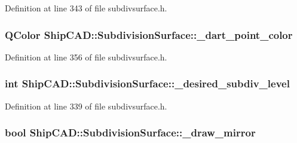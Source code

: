 Definition at line 343 of file subdivsurface.\-h.

\hypertarget{classShipCAD_1_1SubdivisionSurface_a45054fd2d0065a342828bcd675e91307}{
\subsubsection[{\-\_\-dart\-\_\-point\-\_\-color}]{\setlength{\rightskip}{0pt plus 5cm}Q\-Color Ship\-C\-A\-D\-::\-Subdivision\-Surface\-::\-\_\-dart\-\_\-point\-\_\-color\hspace{0.3cm}{\ttfamily [protected]}}}\label{classShipCAD_1_1SubdivisionSurface_a45054fd2d0065a342828bcd675e91307}


Definition at line 356 of file subdivsurface.\-h.

\hypertarget{classShipCAD_1_1SubdivisionSurface_aeec20f09be87e6d57d88f903853ca96f}{
\subsubsection[{\-\_\-desired\-\_\-subdiv\-\_\-level}]{\setlength{\rightskip}{0pt plus 5cm}int Ship\-C\-A\-D\-::\-Subdivision\-Surface\-::\-\_\-desired\-\_\-subdiv\-\_\-level\hspace{0.3cm}{\ttfamily [protected]}}}\label{classShipCAD_1_1SubdivisionSurface_aeec20f09be87e6d57d88f903853ca96f}


Definition at line 339 of file subdivsurface.\-h.

\hypertarget{classShipCAD_1_1SubdivisionSurface_a4ee73ae98bddfe1819419afd1d5ba029}{
\subsubsection[{\-\_\-draw\-\_\-mirror}]{\setlength{\rightskip}{0pt plus 5cm}bool Ship\-C\-A\-D\-::\-Subdivision\-Surface\-::\-\_\-draw\-\_\-mirror\hspace{0.3cm}{\ttfamily [protected]}}}\label{classShipCAD_1_1SubdivisionSurface_a4ee73ae98bddfe1819419afd1d5ba029}


